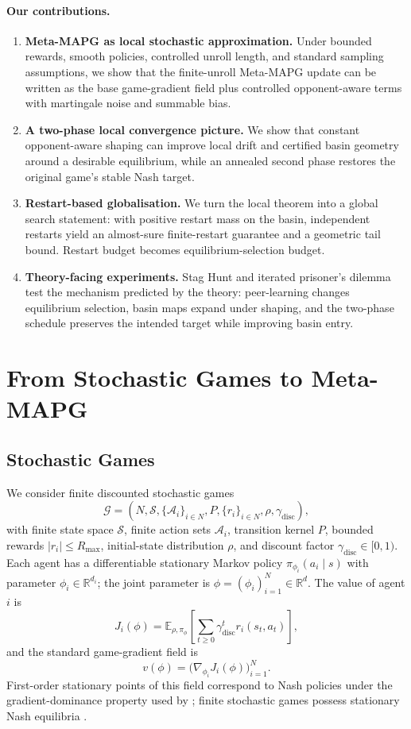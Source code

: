 \documentclass{article}
\theoremstyle{plain}
\theoremstyle{definition}
\theoremstyle{remark}
\newcommand{\E}{\mathbb{E}}
\newcommand{\R}{\mathbb{R}}
\begin{document}
\paragraph{Our contributions.}
\begin{enumerate}[label=\arabic*),leftmargin=1.4em,itemsep=0.2em]
\item \textbf{Meta-MAPG as local stochastic approximation.} Under bounded rewards, smooth policies, controlled unroll length, and standard sampling assumptions, we show that the finite-unroll Meta-MAPG update can be written as the base game-gradient field plus controlled opponent-aware terms with martingale noise and summable bias.
\item \textbf{A two-phase local convergence picture.} We show that constant opponent-aware shaping can improve local drift and certified basin geometry around a desirable equilibrium, while an annealed second phase restores the original game's stable Nash target.
\item \textbf{Restart-based globalisation.} We turn the local theorem into a global search statement: with positive restart mass on the basin, independent restarts yield an almost-sure finite-restart guarantee and a geometric tail bound. Restart budget becomes equilibrium-selection budget.
\item \textbf{Theory-facing experiments.} Stag Hunt and iterated prisoner's dilemma test the mechanism predicted by the theory: peer-learning changes equilibrium selection, basin maps expand under shaping, and the two-phase schedule preserves the intended target while improving basin entry.
\end{enumerate}

\section{From Stochastic Games to Meta-MAPG}\label{sec:setup}

\subsection{Stochastic Games}

We consider finite discounted stochastic games
\[
\mathcal{G}=(N,\mathcal{S},\{\mathcal{A}_i\}_{i\in N},P,\{r_i\}_{i\in N},\rho,\gamma_{\mathrm{disc}}),
\]
with finite state space $\mathcal{S}$, finite action sets $\mathcal{A}_i$, transition kernel $P$, bounded rewards $|r_i|\le R_{\max}$, initial-state distribution $\rho$, and discount factor $\gamma_{\mathrm{disc}}\in[0,1)$. Each agent has a differentiable stationary Markov policy $\pi_{\phi_i}(a_i\mid s)$ with parameter $\phi_i\in\R^{d_i}$; the joint parameter is $\phi=(\phi_i)_{i=1}^N\in\R^d$. The value of agent $i$ is
\[
J_i(\phi)=\E_{\rho,\pi_\phi}\!\left[\sum_{t\ge 0}\gamma_{\mathrm{disc}}^t r_i(s_t,a_t)\right],
\]
and the standard game-gradient field is
\[
v(\phi)=\bigl(\nabla_{\phi_i}J_i(\phi)\bigr)_{i=1}^N.
\]
First-order stationary points of this field correspond to Nash policies under the gradient-dominance property used by \citet{giannou2022convergence}; finite stochastic games possess stationary Nash equilibria \citep{fink1964equilibrium}.
\end{document}
